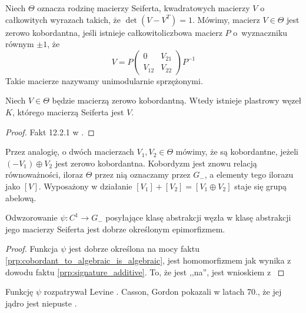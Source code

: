 
Niech $\Theta$ oznacza rodzinę macierzy Seiferta, kwadratowych macierzy $V$ o całkowitych wyrazach takich, że $\det (V - V^T) = 1$.
Mówimy, macierz $V \in \Theta$ jest zerowo kobordantna, jeśli istnieje całkowitoliczbowa macierz $P$ o~wyznaczniku równym $\pm 1$, że
\begin{equation}
    V = P \begin{pmatrix} 0 & V_{21} \\ V_{12} & V_{22} \end{pmatrix} P^{-1}
\end{equation}
Takie macierze nazywamy unimodularnie sprzężonymi.

\begin{proposition}
    Niech $V \in \Theta$ będzie macierzą zerowo kobordantną.
    Wtedy istnieje plastrowy węzeł $K$, którego macierzą Seiferta jest $V$.
\end{proposition}

\begin{proof}
    Fakt 12.2.1 w \cite{kawauchi96}.
\end{proof}

Przez analogię, o dwóch macierzach $V_1, V_2 \in \Theta$ mówimy, że są kobordantne, jeżeli $(-V_1) \oplus V_2$ jest zerowo kobordantna.
Kobordyzm jest znowu relacją równoważności, iloraz $\Theta$ przez nią oznaczamy przez $G_-$, a elementy tego ilorazu jako $[V]$.
Wyposażony w działanie $[V_1] + [V_2] = [V_1 \oplus V_2]$ staje się grupą abelową.

\begin{proposition}
    Odwzorowanie $\psi \colon C^1 \to G_-$ posyłające klasę abstrakcji węzła w klasę abstrakcji jego macierzy Seiferta jest dobrze określonym epimorfizmem.
\end{proposition}

\begin{proof}
    Funkcja $\psi$ jest dobrze określona na mocy faktu \ref{prp:cobordant_to_algebraic_is_algebraic}, jest homomorfizmem jak wynika z dowodu faktu \ref{prp:signature_additive}.
    To, że jest ,,na'', jest wnioskiem z \cite[s. 62]{kawauchi96}
\end{proof}

Funkcję $\psi$ rozpatrywał Levine \cite{levine69}.
%
Casson, Gordon pokazali w latach 70., że jej jądro jest niepuste \cite{gordon78}.
%
%

